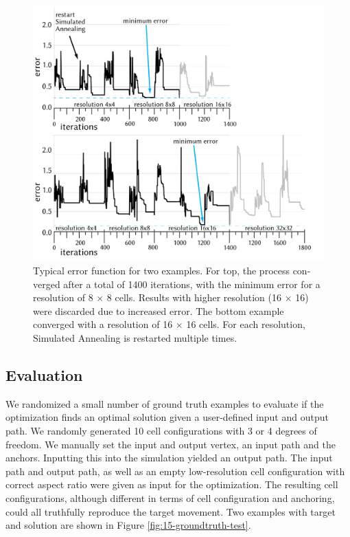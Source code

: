 \begin{figure} [h]
    \includegraphics[width=\textwidth]{chapters/understanding-metamaterial-mechanisms-FIG/14-optimization-error-analysis.png}
    \caption[Short figure name.]{Typical error function for two examples. For top, the process con-verged after a total of 1400 iterations, with the minimum error for a resolution of 8 $\times$ 8 cells. Results with higher resolution (16 $\times$ 16) were discarded due to increased error. The bottom example converged with a resolution of 16 $\times$ 16 cells. For each resolution, Simulated Annealing is restarted multiple times.
    \label{fig:14-optimization-error-analysis}}
\end{figure}


\subsection{Evaluation}

We randomized a small number of ground truth examples to evaluate if the optimization finds an optimal solution given a user-defined input and output path. We randomly generated 10 cell configurations with 3 or 4 degrees of freedom. We manually set the input and output vertex, an input path and the anchors. Inputting this into the simulation yielded an output path. The input path and output path, as well as an empty low-resolution cell configuration with correct aspect ratio were given as input for the optimization. The resulting cell configurations, although different in terms of cell configuration and anchoring, could all truthfully reproduce the target movement. Two examples with target and solution are shown in Figure \ref{fig:15-groundtruth-test}. 

